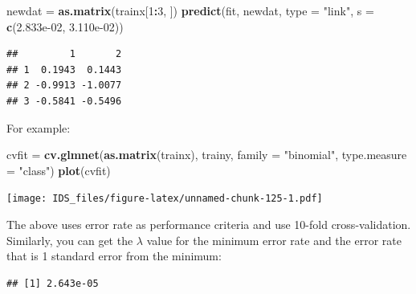 \documentclass[12pt,]{krantz}
\makeatletter
\newenvironment{Shaded}{\begin{snugshade}}{\end{snugshade}}
\newcommand{\DataTypeTok}[1]{\textcolor[rgb]{0.27,0.27,0.27}{#1}}
\newcommand{\DecValTok}[1]{\textcolor[rgb]{0.06,0.06,0.06}{#1}}
\newcommand{\FloatTok}[1]{\textcolor[rgb]{0.06,0.06,0.06}{#1}}
\newcommand{\KeywordTok}[1]{\textcolor[rgb]{0.27,0.27,0.27}{\textbf{#1}}}
\newcommand{\NormalTok}[1]{#1}
\newcommand{\OperatorTok}[1]{\textcolor[rgb]{0.43,0.43,0.43}{\textbf{#1}}}
\newcommand{\StringTok}[1]{\textcolor[rgb]{0.5,0.5,0.5}{#1}}
\newenvironment{kframe}{%
\medskip{}
\setlength{\fboxsep}{.8em}
 \def\at@end@of@kframe{}%
 \ifinner\ifhmode%
  \def\at@end@of@kframe{\end{minipage}}%
  \begin{minipage}{\columnwidth}%
 \fi\fi%
 \def\FrameCommand##1{\hskip\@totalleftmargin \hskip-\fboxsep
 \colorbox{shadecolor}{##1}\hskip-\fboxsep
     \hskip-\linewidth \hskip-\@totalleftmargin \hskip\columnwidth}%
 \MakeFramed {\advance\hsize-\width
   \@totalleftmargin\z@ \linewidth\hsize
   \@setminipage}}%
 {\par\unskip\endMakeFramed%
 \at@end@of@kframe}
\renewenvironment{Shaded}{\begin{kframe}}{\end{kframe}}
\makeatother
\begin{document}
\begin{Shaded}
\begin{Highlighting}[]
\NormalTok{newdat =}\StringTok{ }\KeywordTok{as.matrix}\NormalTok{(trainx[}\DecValTok{1}\OperatorTok{:}\DecValTok{3}\NormalTok{, ])}
\KeywordTok{predict}\NormalTok{(fit, newdat, }\DataTypeTok{type =} \StringTok{"link"}\NormalTok{, }\DataTypeTok{s =} \KeywordTok{c}\NormalTok{(}\FloatTok{2.833e-02}\NormalTok{, }\FloatTok{3.110e-02}\NormalTok{))}
\end{Highlighting}
\end{Shaded}

\begin{verbatim}
##         1       2
## 1  0.1943  0.1443
## 2 -0.9913 -1.0077
## 3 -0.5841 -0.5496
\end{verbatim}

For example:

\begin{Shaded}
\begin{Highlighting}[]
\NormalTok{cvfit =}\StringTok{ }\KeywordTok{cv.glmnet}\NormalTok{(}\KeywordTok{as.matrix}\NormalTok{(trainx), trainy, }
                  \DataTypeTok{family =} \StringTok{"binomial"}\NormalTok{, }\DataTypeTok{type.measure =} \StringTok{"class"}\NormalTok{)}
\KeywordTok{plot}\NormalTok{(cvfit)}
\end{Highlighting}
\end{Shaded}

\texttt{[image: IDS\_files/figure-latex/unnamed-chunk-125-1.pdf]}

The above uses error rate as performance criteria and use 10-fold cross-validation. Similarly, you can get the \(\lambda\) value for the minimum error rate and the error rate that is 1 standard error from the minimum:

\begin{Shaded}
\end{Shaded}

\begin{verbatim}
## [1] 2.643e-05
\end{verbatim}

\begin{Shaded}
\end{Shaded}
\end{document}
